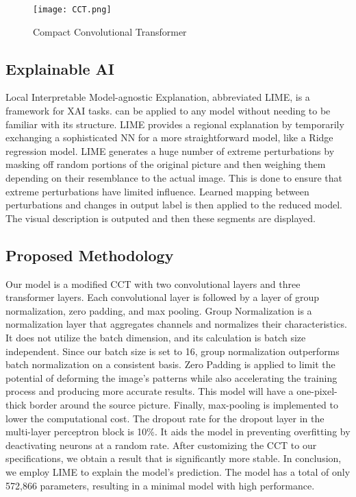 \documentclass[conference]{IEEEtran}
\begin{document}
\begin{figure}[htbp]
\centerline{\texttt{[image: CCT.png]}}
\caption{Compact Convolutional Transformer}
\label{cct_fig}
\end{figure}

\subsection{Explainable AI}

Local Interpretable Model-agnostic Explanation, abbreviated LIME, is a framework for XAI tasks. \cite{ribeiro2016why} can be applied to any model without needing to be familiar with its structure. LIME provides a regional explanation by temporarily exchanging a sophisticated NN for a more straightforward model, like a Ridge regression model. LIME generates a huge number of extreme perturbations by masking off random portions of the original picture and then weighing them depending on their resemblance to the actual image. This is done to ensure that extreme perturbations have limited influence. Learned mapping between perturbations and changes in output label is then applied to the reduced model. The visual description is outputed and then these segments are displayed.



\subsection{Proposed Methodology}
Our model is a modified CCT with two convolutional layers and three transformer layers. Each convolutional layer is followed by a layer of group normalization, zero padding, and max pooling. Group Normalization is a normalization layer that aggregates channels and normalizes their characteristics. It does not utilize the batch dimension, and its calculation is batch size independent. Since our batch size is set to 16, group normalization outperforms batch normalization on a consistent basis. Zero Padding is applied to limit the potential of deforming the image's patterns while also accelerating the training process and producing more accurate results. This model will have a one-pixel-thick border around the source picture. Finally, max-pooling is implemented to lower the computational cost. The dropout rate for the dropout layer in the multi-layer perceptron block is 10\%. It aids the model in preventing overfitting by deactivating neurons at a random rate. After customizing the CCT to our specifications, we obtain a result that is significantly more stable. In conclusion, we employ LIME to explain the model's prediction. The model has a total of only 572,866 parameters, resulting in a minimal model with high performance.
\end{document}
